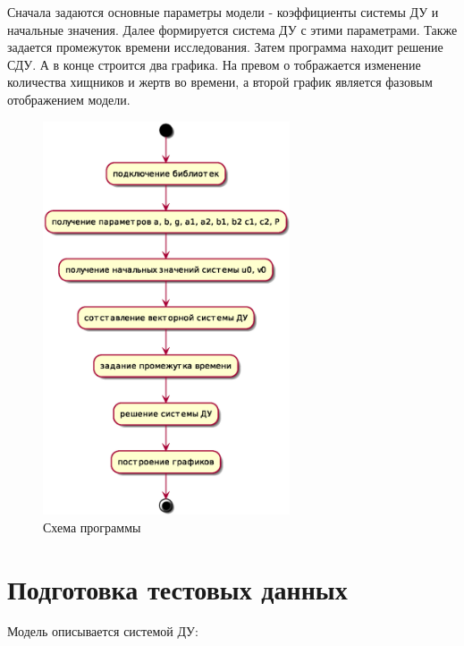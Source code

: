 \documentclass[
  13pt,
  fontsize=13pt,
  russian,
  a4paper,
,captions=tableheading
]{scrreprt}
\begin{document}
Сначала задаются основные параметры модели - коэффициенты системы ДУ и
начальные значения. Далее формируется система ДУ с этими параметрами.
Также задается промежуток времени исследования. Затем программа находит
решение СДУ. А в конце строится два графика. На превом о тображается
изменение количества хищников и жертв во времени, а второй график
является фазовым отображением модели.

\begin{figure}
\hypertarget{fig:main-program-diagram}{%
\centering
\includegraphics[width=0.65\textwidth,height=\textheight]{plantuml-images/b03e25730a3eeac3fcc1f4c9509882693fe1d580.eps}
\caption{Схема программы}\label{fig:main-program-diagram}
}
\end{figure}

\hypertarget{ux43fux43eux434ux433ux43eux442ux43eux432ux43aux430-ux442ux435ux441ux442ux43eux432ux44bux445-ux434ux430ux43dux43dux44bux445}{%
\section{Подготовка тестовых
данных}\label{ux43fux43eux434ux433ux43eux442ux43eux432ux43aux430-ux442ux435ux441ux442ux43eux432ux44bux445-ux434ux430ux43dux43dux44bux445}}

Модель описывается системой ДУ:
\end{document}
